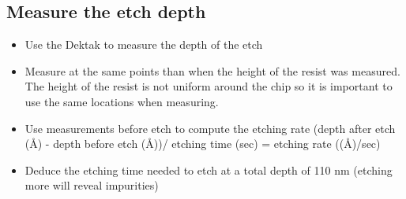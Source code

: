 \subsection{Measure the etch depth}
\begin{itemize}
\item Use the Dektak to measure the depth of the etch
\item Measure at the same points than when the height of the resist was measured. The height of the resist is not uniform around the chip so it
is important to use the same locations when measuring.
\item Use measurements before etch to compute the etching rate (depth after etch (\AA) - depth before etch (\AA))/ etching time (sec) = etching rate ((\AA)/sec)
\item Deduce the etching time needed to etch at a total depth of 110 nm (etching more will reveal impurities)
\end{itemize}
\newpage

